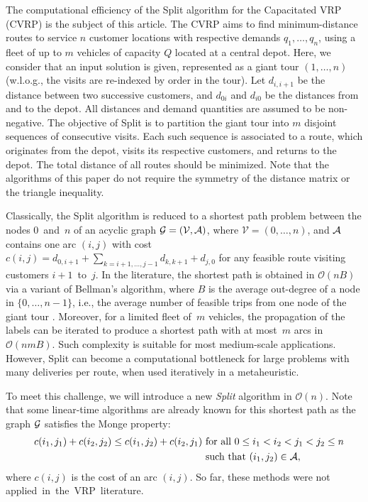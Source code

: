 \documentclass[11pt]{article}
\newcommand{\cO}{{\mathcal O}}
\newcommand{\cA}{{\cal A}}
\newcommand{\cG}{{\cal G}}
\newcommand{\cV}{{\mathcal V}}
\newcommand{\blue}[1]{{#1}}
\begin{document}
\blue{The computational efficiency of the Split algorithm for the Capacitated VRP (CVRP) is the subject of  this article. The CVRP aims to find minimum-distance routes to service $n$ customer locations with respective demands $q_1,\dots,q_n$, using a fleet of up to $m$ vehicles of capacity $Q$ located at a central depot. Here, we consider that an input solution is given, represented as a giant tour $(1,\dots,n)$ (w.l.o.g., the visits are re-indexed by order in the tour). Let $d_{i,i+1}$ be the distance between two successive customers, and $d_{0i}$ and $d_{i0}$ be the distances from and to the depot. All distances and demand quantities are assumed to be non-negative. The objective of Split is to partition the giant tour into $m$ disjoint sequences of consecutive visits. Each such sequence is associated to a route, which originates from the depot, visits its respective customers, and returns to the depot. The total distance of all routes should be minimized. Note that the algorithms of this paper do not require the symmetry of the distance matrix or the triangle inequality.}

\blue{Classically, the Split algorithm is reduced to a shortest path problem between the nodes $0$~and~$n$ of an acyclic graph $\cG = (\cV,\cA)$, where $\cV = (0,\dots,n)$, and $\cA$ contains one arc $(i,j)$ with cost $c(i,j) = d_{0,i+1} + \sum_{k=i+1,\dots,j-1} d_{k,k+1} + d_{j,0}$
for any feasible route visiting customers $i+1$~to~$j$.
In the literature, the shortest path is obtained in $\cO(nB)$ via a variant of Bellman's algorithm, where $B$ is the average out-degree of a node in $\{0,\dots,n-1\}$, i.e., the average number of feasible trips from one node of the giant tour \citep{Beasley1983,Prins2004}.}
Moreover, for a limited fleet of~$m$ vehicles, the propagation of the labels can be iterated to produce a shortest path with at most~$m$ arcs in $\cO(nmB)$. Such complexity is suitable for most medium-scale applications. However, Split can become a computational bottleneck for large problems \blue{with many deliveries per route}, when used iteratively in a metaheuristic.

To meet this challenge, we will introduce a new \emph{Split} algorithm in $\cO(n)$.
Note that some linear-time algorithms are already known for this shortest path \citep[see][and the references therein]{Burkard1996,Bein2005} as the graph $\cG$ satisfies the Monge property:
\begin{equation}
\begin{aligned}
&& c(i_1,j_1) + c(i_2,j_2) \leq c(i_1,j_2) + c(i_2,j_1)  &\text{ for all } 0 \leq i_1 < i_2 < j_1 < j_2 \leq n  \\
&&&\blue{\text{ such that } (i_1,j_2) \in \cA},
\end{aligned}
\end{equation}
where $c(i,j)$ is the cost of an arc $(i,j)$.
So far, these methods were not applied~in~the~VRP~literature.
\end{document}
